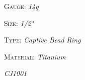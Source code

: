 \documentclass[8pt]{article}
\date{\today}
\title{}
\begin{document}
{\textsc{Gauge}}:      {\scriptsize\textit{14g}}

{\textsc{Size}}:      {\scriptsize\textit{1/2"}}

{\textsc{Type}}:      {\scriptsize\textit{Captive Bead Ring}}

{\textsc{Material}}:      {\scriptsize\textit{Titanium}}

{\scriptsize\textit{CJ1001}}
\end{document}
